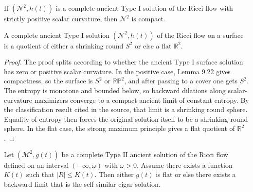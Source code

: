 \begin{lemma}
\label{ch09-lem-ancient-type-i-surface-compact}
If \((\mathcal N^2,h(t))\) is a complete ancient Type I solution of the Ricci flow with strictly positive scalar curvature, then \(\mathcal N^2\) is compact.
\end{lemma}

\begin{proposition}
\label{ch09-prop-type-i-surface-classification}
A complete ancient Type I solution \((\mathcal N^2,h(t))\) of the Ricci flow on a surface is a quotient of either a shrinking round \(S^2\) or else a flat \(\mathbb R^2\).
\end{proposition}

\begin{proof}
\sketch The proof splits according to whether the ancient Type I surface solution has zero or positive scalar curvature. In the positive case, Lemma 9.22 gives compactness, so the surface is \(S^2\) or \(\mathbb{RP}^2\), and after passing to a cover one gets \(S^2\). The entropy is monotone and bounded below, so backward dilations along scalar-curvature maximizers converge to a compact ancient limit of constant entropy. By the classification result cited in the source, that limit is a shrinking round sphere. Equality of entropy then forces the original solution itself to be a shrinking round sphere. In the flat case, the strong maximum principle gives a flat quotient of \(\mathbb R^2\).
\end{proof}

\begin{proposition}
\label{ch09-prop-type-ii-ancient-surface-limits}
Let \((\mathcal M^2,g(t))\) be a complete Type II ancient solution of the Ricci flow defined on an interval \((-\infty,\omega)\) with \(\omega>0\). Assume there exists a function \(K(t)\) such that \(|R|\le K(t)\). Then either \(g(t)\) is flat or else there exists a backward limit that is the self-similar cigar solution.
\end{proposition}

